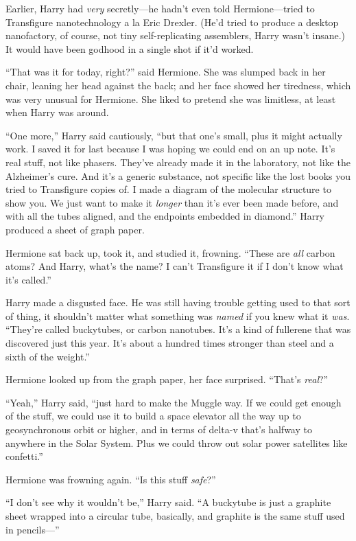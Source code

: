 Earlier, Harry had \emph{very} secretly—he hadn’t even told Hermione—tried to Transfigure nanotechnology a la Eric Drexler. (He’d tried to produce a desktop nanofactory, of course, not tiny self-replicating assemblers, Harry wasn’t insane.) It would have been godhood in a single shot if it’d worked.

“That was it for today, right?” said Hermione. She was slumped back in her chair, leaning her head against the back; and her face showed her tiredness, which was very unusual for Hermione. She liked to pretend she was limitless, at least when Harry was around.

“One more,” Harry said cautiously, “but that one’s small, plus it might actually work. I saved it for last because I was hoping we could end on an up note. It’s real stuff, not like phasers. They’ve already made it in the laboratory, not like the Alzheimer’s cure. And it’s a generic substance, not specific like the lost books you tried to Transfigure copies of. I made a diagram of the molecular structure to show you. We just want to make it \emph{longer} than it’s ever been made before, and with all the tubes aligned, and the endpoints embedded in diamond.” Harry produced a sheet of graph paper.

Hermione sat back up, took it, and studied it, frowning. “These are \emph{all} carbon atoms? And Harry, what’s the name? I can’t Transfigure it if I don’t know what it’s called.”

Harry made a disgusted face. He was still having trouble getting used to that sort of thing, it shouldn’t matter what something was \emph{named} if you knew what it \emph{was}. “They’re called buckytubes, or carbon nanotubes. It’s a kind of fullerene that was discovered just this year. It’s about a hundred times stronger than steel and a sixth of the weight.”

Hermione looked up from the graph paper, her face surprised. “That’s \emph{real}?”

“Yeah,” Harry said, “just hard to make the Muggle way. If we could get enough of the stuff, we could use it to build a space elevator all the way up to geosynchronous orbit or higher, and in terms of delta-v that’s halfway to anywhere in the Solar System. Plus we could throw out solar power satellites like confetti.”

Hermione was frowning again. “Is this stuff \emph{safe}?”

“I don’t see why it wouldn’t be,” Harry said. “A buckytube is just a graphite sheet wrapped into a circular tube, basically, and graphite is the same stuff used in pencils—”

